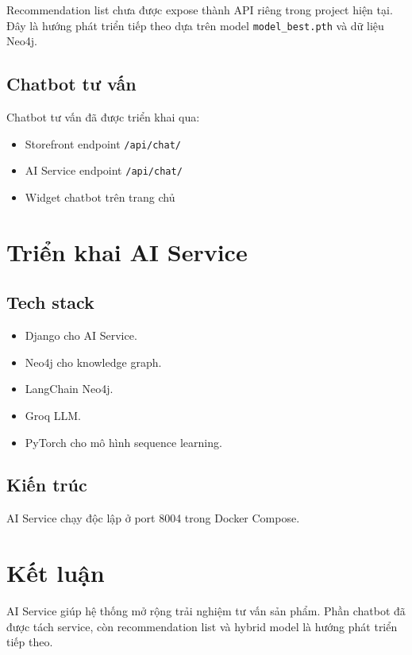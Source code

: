 \documentclass[12pt,a4paper]{report}
\begin{document}
Recommendation list chưa được expose thành API riêng trong project hiện tại. Đây là hướng phát triển tiếp theo dựa trên model \texttt{model\_best.pth} và dữ liệu Neo4j.

\subsection{Chatbot tư vấn}

Chatbot tư vấn đã được triển khai qua:

\begin{itemize}
  \item Storefront endpoint \texttt{/api/chat/}
  \item AI Service endpoint \texttt{/api/chat/}
  \item Widget chatbot trên trang chủ
\end{itemize}

\section{Triển khai AI Service}

\subsection{Tech stack}

\begin{itemize}
  \item Django cho AI Service.
  \item Neo4j cho knowledge graph.
  \item LangChain Neo4j.
  \item Groq LLM.
  \item PyTorch cho mô hình sequence learning.
\end{itemize}

\subsection{Kiến trúc}

AI Service chạy độc lập ở port 8004 trong Docker Compose.

\section{Kết luận}

AI Service giúp hệ thống mở rộng trải nghiệm tư vấn sản phẩm. Phần chatbot đã được tách service, còn recommendation list và hybrid model là hướng phát triển tiếp theo.
\end{document}
